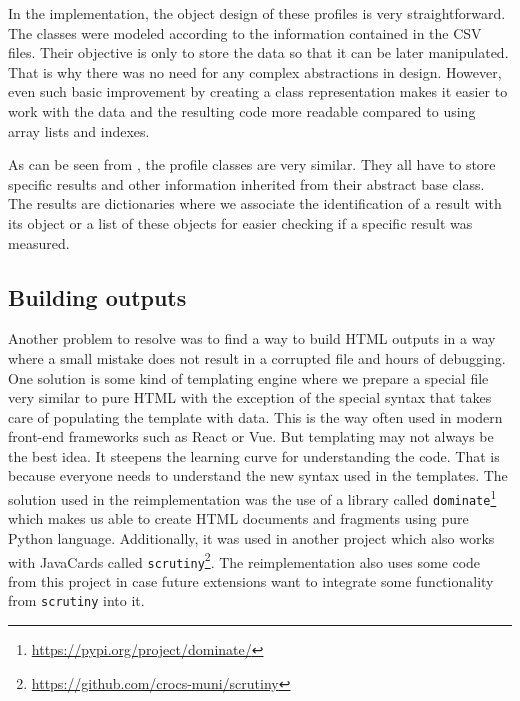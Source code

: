 In the implementation, the object design of these profiles is very straightforward. The classes were modeled according to the information contained in the CSV files. Their objective is only to store the data so that it can be later manipulated. That is why there was no need for any complex abstractions in design. However, even such basic improvement by creating a class representation makes it easier to work with the data and the resulting code more readable compared to using array lists and indexes.

As can be seen from , the profile classes are very similar. They all have to store specific results and other information inherited from their abstract base class. The results are dictionaries where we associate the identification of a result with its object or a list of these objects for easier checking if a specific result was measured.


\subsection{Building outputs}
Another problem to resolve was to find a way to build HTML outputs in a way where a small mistake does not result in a corrupted file and hours of debugging. One solution is some kind of templating engine where we prepare a special file very similar to pure HTML with the exception of the special syntax that takes care of populating the template with data. This is the way often used in modern front-end frameworks such as React or Vue. But templating may not always be the best idea. It steepens the learning curve for understanding the code. That is because everyone needs to understand the new syntax used in the templates. The solution used in the reimplementation was the use of a library called \texttt{dominate}\footnote{\url{https://pypi.org/project/dominate/}} which makes us able to create HTML documents and fragments using pure Python language. Additionally, it was used in another project which also works with JavaCards called \texttt{scrutiny}\footnote{\url{https://github.com/crocs-muni/scrutiny}}. The reimplementation also uses some code from this project in case future extensions want to integrate some functionality from \texttt{scrutiny} into it.

